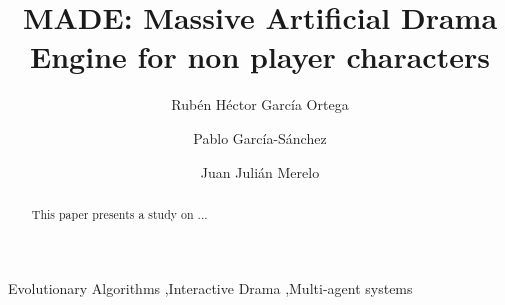 \documentclass[final,1p,times]{elsarticle}
\begin{document}
\begin{frontmatter}



\title{MADE: Massive Artificial Drama Engine for non player characters}

\author[fidesol]{Rub\'en H\'ector Garc\'ia Ortega} %
\author[ugr]{Pablo Garc\'ia-S\'anchez}
\author[ugr]{Juan Juli\'an Merelo}

\address[fidesol]{Fundaci\'on I+D del Software Libre, Granada, Spain} %
\address[ugr]{Department of Computer Architecture and Computer Technology and CITIC-UGR, University of Granada, Granada, Spain. Tel: +34958241778. Fax: +34958248993}



\begin{abstract}
This paper presents a study on ...

\end{abstract}

\begin{keyword}
Evolutionary Algorithms \sep Interactive Drama \sep Multi-agent systems%
\end{keyword}

\end{frontmatter}
\end{document}
